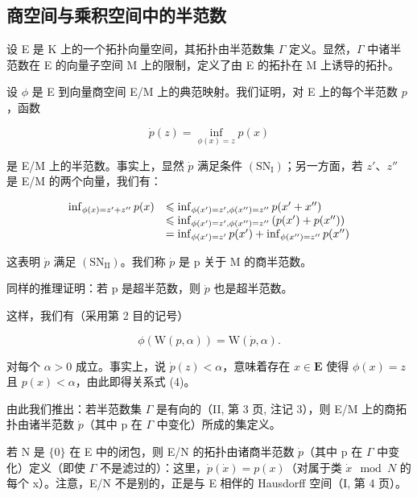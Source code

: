 \subsection{商空间与乘积空间中的半范数}

设 E 是 K 上的一个拓扑向量空间，其拓扑由半范数集 \(\Gamma\) 定义。显然，\(\Gamma\) 中诸半范数在 E 的向量子空间 M 上的限制，定义了由 E 的拓扑在 M 上诱导的拓扑。

设 \(\phi\) 是 E 到向量商空间 E/M 上的典范映射。我们证明，对 E 上的每个半范数 \(p\)，函数

\[
\dot {p} (z) = \inf _ {\phi (x) = z} p (x)\tag{3}
\]

是 E/M 上的半范数。事实上，显然 \(\dot{p}\) 满足条件 \((\mathrm{SN}_{\mathrm{I}})\)；另一方面，若 \(z'\)、\(z''\) 是 E/M 的两个向量，我们有：

\[
\begin{array}{r l} \inf _ {\phi (x) = z ^ {\prime} + z ^ {\prime \prime}} p (x) & \leqslant \inf _ {\phi (x ^ {\prime}) = z ^ {\prime}, \phi (x ^ {\prime \prime}) = z ^ {\prime \prime}} p (x ^ {\prime} + x ^ {\prime \prime}) \\ & \leqslant \inf _ {\phi (x ^ {\prime}) = z ^ {\prime}, \phi (x ^ {\prime \prime}) = z ^ {\prime \prime}} \left(p (x ^ {\prime}) + p (x ^ {\prime \prime})\right) \\ & = \inf _ {\phi (x ^ {\prime}) = z ^ {\prime}} p (x ^ {\prime}) + \inf _ {\phi (x ^ {\prime \prime}) = z ^ {\prime \prime}} p (x ^ {\prime \prime}) \end{array}
\]

这表明 \(\dot{p}\) 满足 \((\mathrm{SN}_{\mathrm{II}})\)。我们称 \(\dot{p}\) 是 p 关于 M 的商半范数。

同样的推理证明：若 p 是超半范数，则 \(\dot{p}\) 也是超半范数。

这样，我们有（采用第 2 目的记号）

\[
\phi (\mathrm{W} (p, \alpha)) = \mathrm{W} (\dot {p}, \alpha).\tag{4}
\]

对每个 \(\alpha > 0\) 成立。事实上，说 \(\dot{p}(z) < \alpha\)，意味着存在 \(x \in \mathbf{E}\) 使得 \(\phi(x) = z\) 且 \(p(x) < \alpha\)，由此即得关系式 (4)。

由此我们推出：若半范数集 \(\Gamma\) 是有向的（II, 第 3 页, 注记 3），则 E/M 上的商拓扑由诸半范数 \(\dot{p}\)（其中 p 在 \(\Gamma\) 中变化）所成的集定义。

若 N 是 \(\{0\}\) 在 E 中的闭包，则 E/N 的拓扑由诸商半范数 \(\dot{p}\)（其中 p 在 \(\Gamma\) 中变化）定义（即使 \(\Gamma\) 不是滤过的）：这里，\(\dot{p}(\dot{x}) = p(x)\)（对属于类 \(\dot{x} \mod N\) 的每个 x）。注意，E/N 不是别的，正是与 E 相伴的 Hausdorff 空间（I, 第 4 页）。

